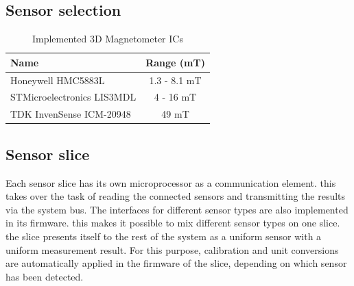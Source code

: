 \documentclass[conference]{IEEEtran}
\begin{document}
\subsection{Sensor selection}


\begin{table}
    \centering
    \begin{tabular}{|l|c|}
    \hline
    \textbf{Name} & \textbf{Range (mT)} \\
    \hline
    Honeywell HMC5883L & 1.3 - 8.1 mT \\
    STMicroelectronics LIS3MDL & 4 - 16 mT \\
    TDK InvenSense ICM-20948 & 49 mT \\
    \hline
    \end{tabular}
    \caption{Implemented 3D Magnetometer ICs}
    \label{implemented_sensors_fig}
\end{table}


\subsection{Sensor slice}

Each sensor slice has its own microprocessor as a communication element. this takes over the task of reading the connected sensors and transmitting the results via the system bus.
The interfaces for different sensor types are also implemented in its firmware. this makes it possible to mix different sensor types on one slice. the slice presents itself to the rest of the system as a uniform sensor with a uniform measurement result.
For this purpose, calibration and unit conversions are automatically applied in the firmware of the slice, depending on which sensor has been detected.
\end{document}
